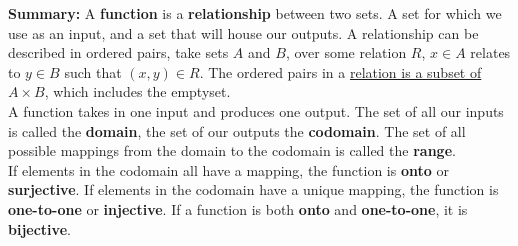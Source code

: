 \vspace{2em}
\begin{greenbox}
    \begin{spacing}{1.5}
        \textbf{Summary: } A \textbf{function} is a \textbf{relationship} between two sets. A set for which we use
        as an input, and a set that will house our outputs. A relationship can be described in
        ordered pairs, take sets $A$ and $B$, over some relation $R$, $x\in A$ relates to $y\in B$
        such that $(x,y)\in R$. The ordered pairs in a \underline{relation is a subset of $A\times B$},
        which includes the emptyset.\\

        \noindent
        A function takes in one input and produces one output. The set of all our inputs is called the
        \textbf{domain}, the set of our outputs the \textbf{codomain}. The set of all possible mappings
        from the domain to the codomain is called the \textbf{range}.\\

        \noindent
        If elements in the codomain all have a mapping, the function is \textbf{onto} or\\
        \textbf{surjective}. If elements in the codomain have a unique mapping, the function is
        \textbf{one-to-one} or \textbf{injective}.
        If a function is both \textbf{onto} and \textbf{one-to-one}, it is \textbf{bijective}.
    \end{spacing}
\end{greenbox}

